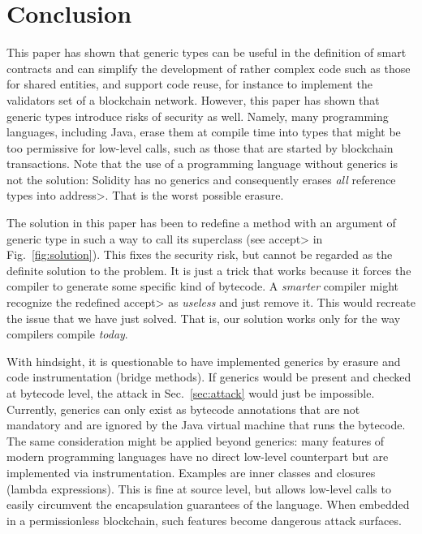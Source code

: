 \section{Conclusion}\label{sec:conclusion} 

This paper has shown that generic types can be useful in the definition
of smart contracts and can simplify the development of rather complex
code such as those for shared entities, and support code reuse, for
instance to implement the validators set of a blockchain network.
However, this paper has shown that generic types
introduce risks of security as well.
Namely, many
programming languages, including Java, erase them at compile time
into types that might be too permissive for low-level calls, such as
those that are started by blockchain transactions. Note that the use of a programming
language without generics is not the solution: Solidity has no generics
and consequently erases \emph{all} reference types into \<address>.
That is the worst possible erasure.

The solution in this paper has been to redefine a method with an argument
of generic type in such a way to call its superclass
(see \<accept> in Fig.~\ref{fig:solution}). This fixes the security risk,
but cannot be regarded as the definite solution to the problem. It is just a trick that
works because it forces the compiler to generate some specific kind of bytecode.
A \emph{smarter} compiler might recognize the redefined \<accept> as
\emph{useless} and just remove it. This would recreate the issue that
we have just solved. That is, our solution works only for the way
compilers compile \emph{today}.

With hindsight, it is questionable to have implemented generics by erasure
and code instrumentation (bridge methods). If generics would be present
and checked at bytecode level, the attack in Sec.~\ref{sec:attack} would just
be impossible. Currently, generics can only exist as bytecode annotations
that are not mandatory and are ignored by the Java virtual machine
that runs the bytecode. The same consideration might be applied beyond
generics: many features of modern programming
languages have no direct low-level
counterpart but are implemented via instrumentation. Examples are
inner classes and closures (lambda expressions). This is fine at source level, but allows
low-level calls to easily circumvent
the encapsulation guarantees of the language. When embedded in a permissionless
blockchain, such features become dangerous attack surfaces.

